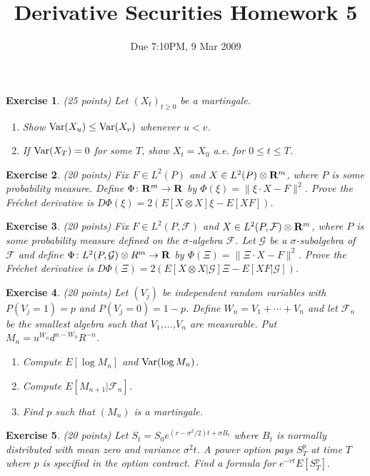 \documentclass[11pt,fleqn]{amsproc}
\newcommand{\R}{{\bf R}}
\newcommand{\F}{\mathcal{F}}
\newcommand{\G}{\mathcal{G}}
\newcommand{\Var}{\mathop{\rm{Var}}}
\newtheorem{xca}{Exercise}
\begin{document}
\title{Derivative Securities Homework 5}
\author{Due 7:10PM, 9 Mar 2009}

\maketitle

\begin{xca}{(25 points)}
Let $(X_t)_{t\ge0}$ be a martingale.
\begin{enumerate}
\item Show $\Var(X_u) \le \Var(X_v)$ whenever $u < v$.
\item If $\Var(X_T) = 0$ for some $T$, show $X_t = X_0$ a.e. for $0\le t\le T$.
\end{enumerate}
\end{xca}

\begin{xca}{(20 points)}
Fix $F\in L^2(P)$ and $X\in L^2(P)\otimes\R^m$, where $P$ is some probability measure.
Define $\Phi\colon\R^m\to\R$ by $\Phi(\xi) = \|\xi\cdot X - F\|^2$. Prove the Fr\'echet
derivative is $D\Phi(\xi) = 2(E[X\otimes X]\xi - E[XF])$.
\end{xca}

\begin{xca}{(20 points)}
Fix $F\in L^2(P, \F)$ and $X\in L^2(P, \F)\otimes\R^m$, where $P$ is some probability measure
defined on the $\sigma$-algebra $\F$. Let $\G$ be a $\sigma$-subalgebra of $\F$ and
define $\Phi\colon L^2(P, \G)\otimes R^m\to\R$ by $\Phi(\Xi) = \|\Xi\cdot X - F\|^2$. Prove the Fr\'echet
derivative is $D\Phi(\Xi) = 2(E[X\otimes X|\G]\Xi - E[XF|\G])$.
\end{xca}

\begin{xca}{(20 points)}
Let $(V_j)$ be independent random variables with $P(V_j = 1) = p$ and $P(V_j = 0) = 1 - p$. Define
$W_n = V_1 + \cdots + V_n$ and let $\F_n$ be the smallest algebra such that $V_1$,...,$V_n$ are
measurable. Put $M_n = u^{W_n}d^{n - W_n} R^{-n}$.
\begin{enumerate}
\item Compute $E[\log M_n]$ and $\Var(\log M_n)$.
\item Compute $E[M_{n + 1}|\F_n]$.
\item Find $p$ such that $(M_n)$ is a martingale.
\end{enumerate}
\end{xca}

\begin{xca}{(20 points)}
Let $S_t = S_0e^{(r - \sigma^2/2)t + \sigma B_t}$ where $B_t$ is normally distributed with mean zero and variance $\sigma^2 t$.
A {\rm power option} pays $S_T^p$ at time $T$ where $p$ is specified in the option contract. Find
a formula for $e^{-rt}E[S_T^p]$.
\end{xca}
\end{document}
